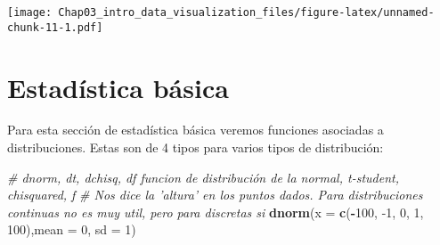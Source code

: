 \documentclass[]{book}
\newenvironment{Shaded}{\begin{snugshade}}{\end{snugshade}}
\newcommand{\CommentTok}[1]{\textcolor[rgb]{0.56,0.35,0.01}{\textit{#1}}}
\newcommand{\DataTypeTok}[1]{\textcolor[rgb]{0.13,0.29,0.53}{#1}}
\newcommand{\DecValTok}[1]{\textcolor[rgb]{0.00,0.00,0.81}{#1}}
\newcommand{\KeywordTok}[1]{\textcolor[rgb]{0.13,0.29,0.53}{\textbf{#1}}}
\newcommand{\NormalTok}[1]{#1}
\newcommand{\OperatorTok}[1]{\textcolor[rgb]{0.81,0.36,0.00}{\textbf{#1}}}
\newcommand{\OtherTok}[1]{\textcolor[rgb]{0.56,0.35,0.01}{#1}}
\newcommand{\StringTok}[1]{\textcolor[rgb]{0.31,0.60,0.02}{#1}}
\begin{document}
\begin{Shaded}
\end{Shaded}

\texttt{[image: Chap03\_intro\_data\_visualization\_files/figure-latex/unnamed-chunk-11-1.pdf]}

\hypertarget{estaduxedstica-buxe1sica}{%
\chapter{Estadística básica}\label{estaduxedstica-buxe1sica}}

Para esta sección de estadística básica veremos funciones asociadas a distribuciones. Estas son de 4 tipos para varios tipos de distribución:

\begin{Shaded}
\begin{Highlighting}[]
\CommentTok{# dnorm, dt, dchisq, df funcion de distribución de la normal, t-student, chisquared, f }
\CommentTok{# Nos dice la 'altura' en los puntos dados. Para distribuciones continuas no es muy util, pero para discretas si}
\KeywordTok{dnorm}\NormalTok{(}\DataTypeTok{x =} \KeywordTok{c}\NormalTok{(}\OperatorTok{-}\DecValTok{100}\NormalTok{, }\DecValTok{-1}\NormalTok{, }\DecValTok{0}\NormalTok{, }\DecValTok{1}\NormalTok{, }\DecValTok{100}\NormalTok{),}\DataTypeTok{mean =} \DecValTok{0}\NormalTok{, }\DataTypeTok{sd =} \DecValTok{1}\NormalTok{)}
\end{Highlighting}
\end{Shaded}
\end{document}

